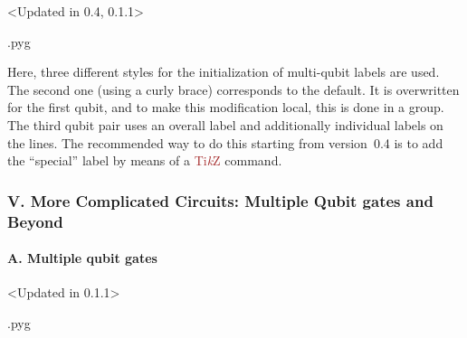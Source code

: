 \documentclass{scrartcl}
\makeatletter
\newenvironment{codeexample}{%
   \VerbatimEnvironment%
   \let\FVB@VerbatimOut\minted@FVB@VerbatimOut
   \let\FVE@VerbatimOut\minted@FVE@VerbatimOut
   \minted@configlang{tex}%
   \minted@fvset
   \begin{VerbatimOut}[codes={\catcode`\^^I=12},firstline,lastline]{\minted@jobname.pyg}%
}{
   \end{VerbatimOut}%
   \minted@langlinenoson%
   \savebox\codeexamplebox{ \minted@jobname.pyg}%
   \ifdim\wd\codeexamplebox>\dimexpr.5\linewidth-3mm\relax%
      \wd\codeexamplebox=.5\linewidth%
   \else%
      \wd\codeexamplebox=\dimexpr\wd\codeexamplebox+3mm\relax%
   \fi%
   \noindent\begin{minipage}{\wd\codeexamplebox}%
      \centering%
      \usebox\codeexamplebox%
   \end{minipage}%
   \begin{minipage}{\dimexpr\linewidth-\wd\codeexamplebox\relax}%
      \minted@pygmentize{\minted@lang}%
   \end{minipage}%
   \minted@langlinenosoff%
   \par%
}
\def\TikZ{\textcolor{brown}{Ti\textit kZ}}
\makeatother
\begin{document}
               \begin{example}<Updated in 0.4, 0.1.1>
                  \begin{codeexample}
                  \end{codeexample}
                  Here, three different styles for the initialization of multi\hyp qubit labels are used.
                  The second one (using a curly brace) corresponds to the default.
                  It is overwritten for the first qubit, and to make this modification local, this is done in a group.
                  The third qubit pair uses an overall label and additionally individual labels on the lines.
                  The recommended way to do this starting from version~0.4 is to add the ``special'' label by means of a \TikZ{} command.
               \end{example}

         \subsubsection{V. More Complicated Circuits: Multiple Qubit gates and Beyond}
            \paragraph{A. Multiple qubit gates}\leavevmode
               \begin{example}<Updated in 0.1.1>
                  \begin{codeexample}
                  \end{codeexample}
               \end{example}
\end{document}

